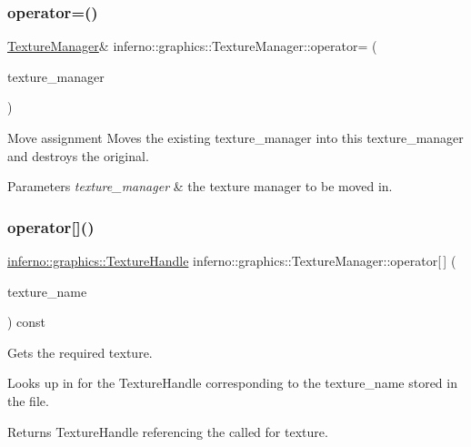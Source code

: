 \subsubsection{\texorpdfstring{operator=()}{operator=()}\hspace{0.1cm}{\footnotesize\ttfamily [2/2]}}
{\footnotesize\ttfamily \mbox{\hyperlink{classinferno_1_1graphics_1_1_texture_manager}{Texture\+Manager}}\& inferno\+::graphics\+::\+Texture\+Manager\+::operator= (\begin{DoxyParamCaption}\item[{\mbox{\hyperlink{classinferno_1_1graphics_1_1_texture_manager}{Texture\+Manager}} \&\&}]{texture\+\_\+manager }\end{DoxyParamCaption})\hspace{0.3cm}{\ttfamily [inline]}}



Move assignment Moves the existing texture\+\_\+manager into this texture\+\_\+manager and destroys the original. 


\begin{DoxyParams}{Parameters}
{\em texture\+\_\+manager} & the texture manager to be moved in. \\
\hline
\end{DoxyParams}
\mbox{\label{classinferno_1_1graphics_1_1_texture_manager_a419b62740d0cbff686820b9b4ccc95e2}} 
\subsubsection{\texorpdfstring{operator[]()}{operator[]()}}
{\footnotesize\ttfamily \mbox{\hyperlink{namespaceinferno_1_1graphics_a9d719bfbfedd17b9ace9b8d603ab5a38}{inferno\+::graphics\+::\+Texture\+Handle}} inferno\+::graphics\+::\+Texture\+Manager\+::operator\mbox{[}$\,$\mbox{]} (\begin{DoxyParamCaption}\item[{std\+::string}]{texture\+\_\+name }\end{DoxyParamCaption}) const}



Gets the required texture. 

Looks up in for the Texture\+Handle corresponding to the texture\+\_\+name stored in the file. \begin{DoxyReturn}{Returns}
Texture\+Handle referencing the called for texture. 
\end{DoxyReturn}
\mbox{\label{classinferno_1_1graphics_1_1_texture_manager_a7b5b7ee8f6c1a65f63de017a933549ef}} 
